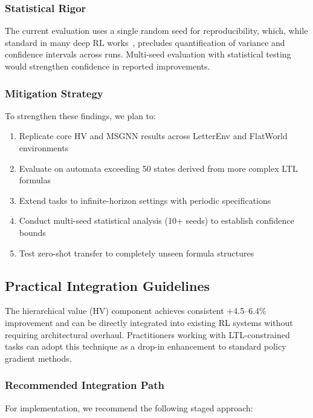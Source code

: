 \documentclass{article}
\begin{document}
\subsubsection{Statistical Rigor}

The current evaluation uses a single random seed for reproducibility, which, while standard in many deep RL works~\citep{Henderson2018}, precludes quantification of variance and confidence intervals across runs. Multi-seed evaluation with statistical testing would strengthen confidence in reported improvements.

\subsubsection{Mitigation Strategy}

To strengthen these findings, we plan to:
\begin{enumerate}
\item Replicate core HV and MSGNN results across LetterEnv and FlatWorld environments
\item Evaluate on automata exceeding 50 states derived from more complex LTL formulas
\item Extend tasks to infinite-horizon settings with periodic specifications
\item Conduct multi-seed statistical analysis (10+ seeds) to establish confidence bounds
\item Test zero-shot transfer to completely unseen formula structures
\end{enumerate}

\subsection{Practical Integration Guidelines}
\label{app:integration}

The hierarchical value (HV) component achieves consistent +4.5--6.4\% improvement and can be directly integrated into existing RL systems without requiring architectural overhaul. Practitioners working with LTL-constrained tasks can adopt this technique as a drop-in enhancement to standard policy gradient methods.

\subsubsection{Recommended Integration Path}

For implementation, we recommend the following staged approach:
\end{document}
